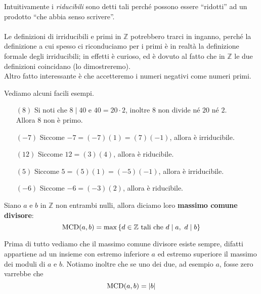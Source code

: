 \begin{osservazione}
	Intuitivamente i \textit{riducibili} sono detti tali perché possono essere \enquote{ridotti} ad un prodotto \enquote{che abbia senso scrivere}. \\ \\ Le definizioni di irriducibili e primi in $\mathbb{Z}$ potrebbero trarci in inganno, perché la definizione a cui spesso ci riconduciamo per i primi è in realtà la definizione formale degli irriducibili; in effetti è curioso, ed è dovuto al fatto che in $\mathbb{Z}$ le due definizioni coincidano (lo dimostreremo). \\ Altro fatto interessante è che accetteremo i numeri negativi come numeri primi.
\end{osservazione}		
\begin{esempio} Vediamo alcuni facili esempi.

	\begin{itemize}
		\item[$(8)$] Si noti che $8\mid 40$ e $40=20\cdot 2$, inoltre $8$ non divide né $20$ né $2$. \\
		Allora 8 non è primo.
		\item[$(-7)$] Siccome $-7 = (-7)(1)=(7)(-1)$, allora è irriducibile.
		\item[$(12)$] Siccome $12 = (3)(4)$, allora è riducibile. 
		\item[$(5)$] Siccome $5 = (5)(1)=(-5)(-1)$, allora è irriducibile. 
		\item[$(-6)$] Siccome $-6 = (-3)(2)$, allora è riducibile. 
	\end{itemize}
\end{esempio}
\begin{definizione}[$\MCD$] Siano $a$ e $b$ in $\mathbb{Z}$ non entrambi nulli, allora diciamo loro \textbf{massimo comune divisore}:
	\begin{equation*}
		\operatorname{\mathrm{MCD}}(a,b)=\max\left\{d \in \mathbb{Z} \ \text{tali che} \ d\mid a, \ d\mid b\right\}
	\end{equation*}
\end{definizione}
\begin{osservazione}
	Prima di tutto vediamo che il massimo comune divisore esiste sempre, difatti appartiene ad un insieme con estremo inferiore $a$ ed estremo superiore il massimo dei moduli di $a$ e $b$.
	Notiamo inoltre che se uno dei due, ad esempio $a$, fosse zero varrebbe che 
	\begin{equation*}
	\operatorname{\mathrm{MCD}}(a,b)= |b|
	\end{equation*}
\end{osservazione}
